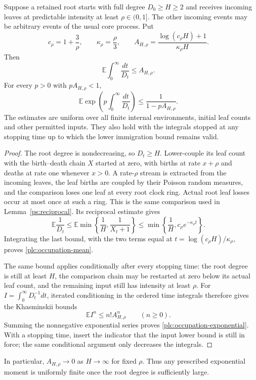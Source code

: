 \begin{proposition}
\label{plc:occupation}
Suppose a retained root starts with full degree $D_0\ge H\ge2$ and
receives incoming leaves at predictable intensity at least
$\rho\in(0,1]$.  The other incoming events may be arbitrary events of
the usual core process.  Put
\[
 c_\rho=1+\frac3\rho,\qquad
 \kappa_\rho=\frac\rho3,\qquad
 A_{H,\rho}=\frac{\log(c_\rho H)+1}{\kappa_\rho H}.
\]
Then
\begin{equation}\label{plc:occupation-mean}
 \mathbb E\int_0^\infty\frac{dt}{D_t}\le A_{H,\rho}.
\end{equation}
For every $p>0$ with $pA_{H,\rho}<1$,
\begin{equation}\label{plc:occupation-exponential}
 \boxed{
 \mathbb E\exp\!\left(p\int_0^\infty\frac{dt}{D_t}\right)
 \le\frac1{1-pA_{H,\rho}}.
 }
\end{equation}
The estimates are uniform over all finite internal environments, initial
leaf counts and other permitted inputs.  They also hold with the
integrals stopped at any stopping time up to which the lower immigration
bound remains valid.
\end{proposition}
\begin{proof}
The root degree is nondecreasing, so $D_t\ge H$.  Lower-couple its
leaf count with the birth--death chain $X$ started at zero, with births
at rate $x+\rho$ and deaths at rate one whenever $x>0$.  A rate-$\rho$
stream is extracted from the incoming leaves, the leaf births are
coupled by their Poisson random measures, and the comparison loses
one leaf at every root clock ring.  Actual root leaf losses occur at
most once at such a ring.  This is the same comparison used in
Lemma~\ref{ps:reciprocal}.  Its reciprocal estimate gives
\[
 \mathbb E\frac1{D_t}
 \le\mathbb E\min\left\{\frac1H,\frac1{X_t+1}\right\}
 \le\min\left\{\frac1H,c_\rho e^{-\kappa_\rho t}\right\}.
\]
Integrating the last bound, with the two terms equal at
$t=\log(c_\rho H)/\kappa_\rho$, proves
\eqref{plc:occupation-mean}.

The same bound applies conditionally after every stopping time: the
root degree is still at least $H$, the comparison chain may be restarted
at zero below its actual leaf count, and the remaining input still has
intensity at least $\rho$.  For
$I=\int_0^\infty D_t^{-1}dt$, iterated conditioning in the ordered
time integrals therefore gives the Khasminskii bounds
\[
 \mathbb E I^n\le n!A_{H,\rho}^n\qquad(n\ge0).
\]
Summing the nonnegative exponential series proves
\eqref{plc:occupation-exponential}.  With a stopping time, insert the
indicator that the input lower bound is still in force; the same
conditional argument only decreases the integrals.
\end{proof}

In particular, $A_{H,\rho}\to0$ as $H\to\infty$ for fixed $\rho$.
Thus any prescribed exponential moment is uniformly finite once the
root degree is sufficiently large.

